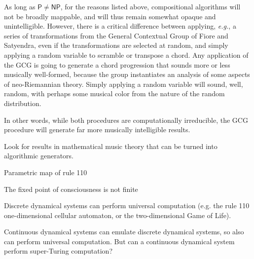 \documentclass[11pt]{scrartcl}
\begin{document}
As long as  $\mathsf{P} \ne \mathsf{NP}$, for the reasons listed above, compositional algorithms will not be broadly mappable, and will thus remain somewhat opaque and unintelligible. However, there is a critical difference between applying, \emph{e.g.}, a series of transformations from the General Contextual Group of Fiore and Satyendra, even if the transformations are selected at random, and simply applying a random variable to scramble or transpose a chord. Any application of the GCG is going to generate a chord progression that sounds more or less musically well-formed, because the group instantiates an analysis of some aspects of neo-Riemannian theory. Simply applying a random variable will sound, well, random, with perhaps some musical color from the nature of the random distribution.

In other words, while both procedures are computationally irreducible, the GCG procedure will generate far more musically intelligible results.

Look for results in mathematical music theory that can be turned into algorithmic generators.





%

Parametric map of rule 110

The fixed point of consciousness is not finite

Discrete dynamical systems can perform universal computation (e.g. the rule 110 one-dimensional cellular automaton, or the two-dimensional Game of Life).

Continuous dynamical systems can emulate discrete dynamical systems, so also can perform universal computation. But can a continuous dynamical system perform super-Turing computation? 

\printbibliography
\end{document}

